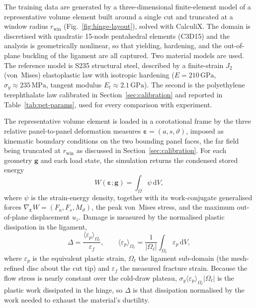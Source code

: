 \documentclass[pdflatex,sn-mathphys-num]{sn-jnl}%
\theoremstyle{thmstyleone}%
\theoremstyle{thmstyletwo}%
\theoremstyle{thmstylethree}%
\newcommand{\epsh}{\bm{\varepsilon}}
\begin{document}
The training data are generated by a three-dimensional finite-element model of a
representative volume element built around a single cut and truncated at a window
radius $r_{\mathrm{win}}$ (Fig.~\ref{fig:hinge-layout}), solved with CalculiX. The
domain is discretised with quadratic 15-node pentahedral elements (C3D15) and the
analysis is geometrically nonlinear, so that yielding, hardening, and the
out-of-plane buckling of the ligament are all captured. Two material models are
used. The reference model is S235 structural steel, described by a finite-strain
$J_2$ (von~Mises) elastoplastic law with isotropic hardening
($E=210\,\mathrm{GPa}$, $\sigma_y\approx235\,\mathrm{MPa}$, tangent modulus
$E_t\approx2.1\,\mathrm{GPa}$). The second is the polyethylene terephthalate law
calibrated in Section~\ref{sec:calibration} and reported in
Table~\ref{tab:pet-params}, used for every comparison with experiment.

The representative volume element is loaded in a corotational frame by the three
relative panel-to-panel deformation measures $\epsh=(a,s,\vartheta)$, imposed as
kinematic boundary conditions on the two bounding panel faces, the far field being
truncated at $r_{\mathrm{win}}$ as discussed in
Section~\ref{sec:calibration}. For each geometry $\bm{g}$ and each load state, the
simulation returns the condensed stored energy
\begin{equation}
  W(\epsh;\bm{g})=\int_\Omega \psi\,\mathrm{d}V ,
\end{equation}
where $\psi$ is the strain-energy density, together with its work-conjugate
generalised forces $\nabla_{\epsh}W=(F_a,F_s,M_\vartheta)$, the peak von~Mises
stress, and the maximum out-of-plane displacement $u_z$. Damage is measured by the
normalised plastic dissipation in the ligament,
\begin{equation}
  \Delta=\frac{\langle\varepsilon_p\rangle_{\Omega_\ell}}{\varepsilon_f},
  \qquad
  \langle\varepsilon_p\rangle_{\Omega_\ell}
    =\frac{1}{|\Omega_\ell|}\int_{\Omega_\ell}\varepsilon_p\,\mathrm{d}V ,
  \label{eq:damage}
\end{equation}
where $\varepsilon_p$ is the equivalent plastic strain, $\Omega_\ell$ the ligament
sub-domain (the mesh-refined disc about the cut tip) and $\varepsilon_f$ the measured
fracture strain. Because the flow stress is nearly constant over the cold-draw
plateau, $\sigma_y\langle\varepsilon_p\rangle_{\Omega_\ell}|\Omega_\ell|$ is the plastic
work dissipated in the hinge, so $\Delta$ is that dissipation normalised by the work
needed to exhaust the material's ductility.
\end{document}
